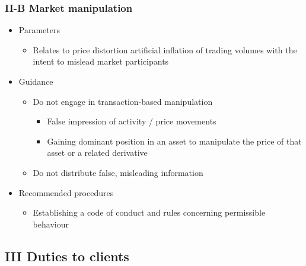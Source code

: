 \documentclass[../notes_compiled.tex]{subfiles}
\begin{document}
\subsubsection{II-B Market manipulation}
\begin{itemize}
\item Parameters
\begin{itemize}
\item Relates to price distortion  artificial inflation of trading volumes with the intent to mislead market participants
\end{itemize}
\item Guidance
\begin{itemize}
\item Do not engage in transaction-based manipulation
\begin{itemize}
\item False impression of activity / price movements
\item Gaining dominant position in an asset to manipulate the price of that asset or a related derivative
\end{itemize}
\item Do not distribute false, misleading information
\end{itemize}
\item Recommended procedures
\begin{itemize}
\item Establishing a code of conduct and rules concerning permissible behaviour
\end{itemize}
\end{itemize}
\subsection{III Duties to clients}
\end{document}
